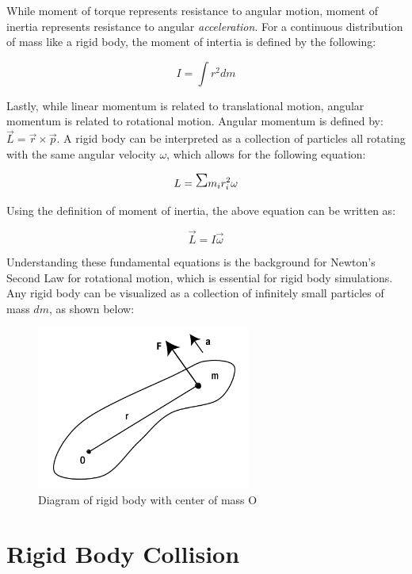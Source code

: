 While moment of torque represents resistance to angular motion, moment of inertia represents resistance to angular \textit{acceleration}.  For a continuous distribution of mass like a rigid body, the moment of intertia is defined by the following:

\begin{equation}\label{momentofintertia}
I =   \int  r^2 dm
\end{equation}

Lastly, while linear momentum is related to translational motion, angular momentum is related to rotational motion.  Angular momentum is defined by:  $\vec{L} = \vec{r} \times \vec{p}$.  A rigid body can be interpreted as a collection of particles all rotating with the same angular velocity $\omega$, which allows for the following equation:

\begin{equation}
L = \mathlarger{\mathlarger{\mathlarger{\Sigma}}} m_i r_i^2 \omega
\end{equation}

Using the definition of moment of inertia, the above equation can be written as:

\begin{equation}
\vec{L} = I \vec{\omega}
\end{equation}

Understanding these fundamental equations is the background for Newton's Second Law for rotational motion, which is essential for rigid body simulations.  Any rigid body can be visualized as a collection of infinitely small particles of mass $dm$, as shown below:

\begin{figure}[h] 
	\centering
		\includegraphics[width=7cm]{Figures/rigidbody.png}

	\caption{Diagram of rigid body with center of mass O}
	\label{fig:rigidbody}
\end{figure}













\section{Rigid Body Collision}



